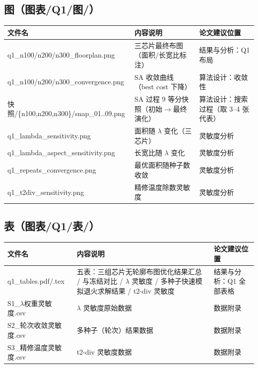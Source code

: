 \documentclass[12pt,a4paper]{article}
\begin{document}
\subsection{图（图表/Q1/图/）}

\begin{table}[H]
\centering
\scriptsize
\setlength{\tabcolsep}{1.5pt}
\begin{tabular}{>{\raggedright\arraybackslash}p{4.4cm}>{\raggedright\arraybackslash}p{7.6cm}>{\raggedright\arraybackslash}p{3.4cm}}
\toprule
文件名 & 内容说明 & 论文建议位置 \\
\midrule
q1\_\allowbreak{}n100/n200/n300\_\allowbreak{}floorplan.png & 三芯片最终布图（面积/长宽比标注） & 结果与分析：Q1 布局 \\
q1\_\allowbreak{}n100/n200/n300\_\allowbreak{}convergence.png & SA 收敛曲线（best cost 下降） & 算法设计：收敛性 \\
快照/\{n100,n200,n300\}/snap\_\allowbreak{}01..09.png & SA 过程 9 等分快照（初始$\to$最终演化） & 算法设计：搜索过程（取 3--4 张代表） \\
q1\_\allowbreak{}lambda\_\allowbreak{}sensitivity.png & 面积随 $\lambda$ 变化（三芯片） & 灵敏度分析 \\
q1\_\allowbreak{}lambda\_\allowbreak{}aspect\_\allowbreak{}sensitivity.png & 长宽比随 $\lambda$ 变化 & 灵敏度分析 \\
q1\_\allowbreak{}repeats\_\allowbreak{}convergence.png & 最优面积随种子数收敛 & 灵敏度分析 \\
q1\_\allowbreak{}t2div\_\allowbreak{}sensitivity.png & 精修温度除数灵敏度 & 灵敏度分析 \\
\bottomrule
\end{tabular}
\end{table}

\subsection{表（图表/Q1/表/）}

\begin{table}[H]
\centering
\scriptsize
\setlength{\tabcolsep}{1.5pt}
\begin{tabular}{>{\raggedright\arraybackslash}p{4.4cm}>{\raggedright\arraybackslash}p{7.6cm}>{\raggedright\arraybackslash}p{3.4cm}}
\toprule
文件名 & 内容说明 & 论文建议位置 \\
\midrule
q1\_\allowbreak{}tables.pdf/.tex & 五表：三组芯片无轮廓布图优化结果汇总 / 与冻结对比 / $\lambda$ 灵敏度 / 多种子快速模拟退火求解结果 / t2-div 灵敏度 & 结果与分析：Q1 全部表格 \\
S1\_\allowbreak{}$\lambda$权重灵敏度.csv & $\lambda$ 灵敏度原始数据 & 数据附录 \\
S2\_\allowbreak{}轮次收敛灵敏度.csv & 多种子（轮次）结果数据 & 数据附录 \\
S3\_\allowbreak{}精修温度灵敏度.csv & t2-div 灵敏度数据 & 数据附录 \\
\bottomrule
\end{tabular}
\end{table}
\end{document}
